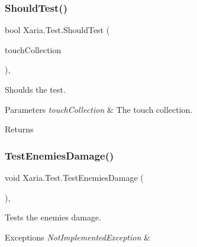 \subsubsection{\texorpdfstring{Should\+Test()}{ShouldTest()}}
{\footnotesize\ttfamily bool Xaria.\+Test.\+Should\+Test (\begin{DoxyParamCaption}\item[{Touch\+Collection}]{touch\+Collection }\end{DoxyParamCaption})\hspace{0.3cm}{\ttfamily [inline]}, {\ttfamily [private]}}



Shoulds the test. 


\begin{DoxyParams}{Parameters}
{\em touch\+Collection} & The touch collection.\\
\hline
\end{DoxyParams}
\begin{DoxyReturn}{Returns}

\end{DoxyReturn}
\mbox{\label{classXaria_1_1Test_ad17445853f03cb253110d639dd87dcf2}} 
\subsubsection{\texorpdfstring{Test\+Enemies\+Damage()}{TestEnemiesDamage()}}
{\footnotesize\ttfamily void Xaria.\+Test.\+Test\+Enemies\+Damage (\begin{DoxyParamCaption}{ }\end{DoxyParamCaption})\hspace{0.3cm}{\ttfamily [inline]}, {\ttfamily [private]}}



Tests the enemies damage. 


\begin{DoxyExceptions}{Exceptions}
{\em Not\+Implemented\+Exception} & \\
\hline
\end{DoxyExceptions}
\mbox{\label{classXaria_1_1Test_a33f6befa401ec79a76fee327f2632a3a}} 
